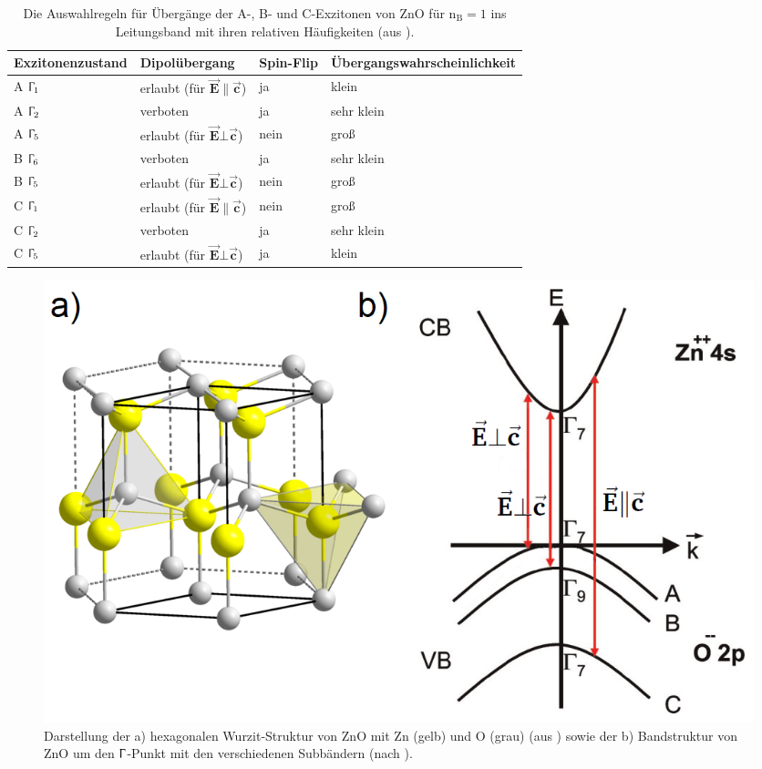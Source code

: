 \begin{table}[h] \centering \begin{footnotesize} \begin{tabular}{llll}
Exzitonenzustand & Dipolübergang & Spin-Flip & Übergangswahrscheinlichkeit\\
\toprule A $\Upgamma_\text{1}$ & erlaubt (für $\vec{\textbf{E}} \|
\vec{\textbf{c}}$) & ja & klein\\ A $\Upgamma_\text{2}$ & verboten & ja & sehr
klein\\ A $\Upgamma_\text{5}$ & erlaubt (für $\vec{\textbf{E}} \bot
\vec{\textbf{c}}$) & nein & groß\\ \midrule B $\Upgamma_\text{6}$ & verboten &
ja & sehr klein\\ B $\Upgamma_\text{5}$ & erlaubt (für $\vec{\textbf{E}} \bot
\vec{\textbf{c}}$) & nein & groß\\ \midrule C $\Upgamma_\text{1}$ & erlaubt (für
$\vec{\textbf{E}} \| \vec{\textbf{c}}$) & nein & groß\\ C $\Upgamma_\text{2}$ &
verboten & ja & sehr klein\\ C $\Upgamma_\text{5}$ & erlaubt (für
$\vec{\textbf{E}} \bot \vec{\textbf{c}}$) & ja & klein\\ \end{tabular}
\end{footnotesize} \caption[Auswahlregeln der Anregung für Exzitonen]{Die
Auswahlregeln für Übergänge der A-, B- und C-Exzitonen von ZnO für
$\text{n}_\text{B}=\text{1}$ ins Leitungsband mit ihren relativen Häufigkeiten
(aus \cite{Klingshirn.2010}).} \label{spinueb} \end{table} \begin{figure}[h]
\centering
\includegraphics[width=.5\textwidth]{Bilder/Vorbetrachtung/ZnO_Str_BG}
\caption[ZnO Kristall- und Bandstruktur]{Darstellung der a) hexagonalen
Wurzit-Struktur von ZnO mit Zn (gelb) und O (grau) (aus \cite{wurzite}) sowie
der b) Bandstruktur von ZnO um den $\Upgamma$-Punkt mit den verschiedenen
Subbändern (nach \cite{Klingshirn.2010}).} \label{ZnO} \end{figure}

